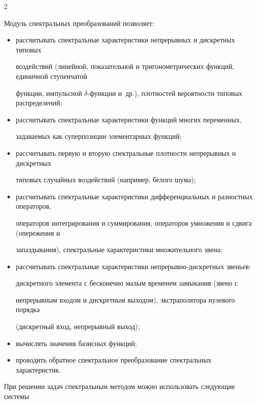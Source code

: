 \begin{multicols}{2}
{Модуль спектральных преобразований позволяет:


\begin{itemize}


  \item рассчитывать спект\-раль\-ные характеристики непрерывных и дискретных типовых 


  воздействий (линейной, показательной и тригонометрических функций, единичной ступенчатой 


  функции, импульсной $\delta$-функ\-ции и~др.), плотностей вероятности типовых распределений;


  \item рассчитывать спект\-раль\-ные характеристики функций многих переменных, 


  задаваемых как суперпозиции элементарных функций;


  \item рассчитывать первую и вторую спект\-раль\-ные плотности непрерывных и дискретных 


  типовых случайных воздействий (например, белого шума);


  \item рассчитывать спект\-раль\-ные характеристики дифференциальных и разностных операторов, 


  операторов интегрирования и суммирования, операторов умножения и сдвига (опережения и 


  запаздывания), спектральные характеристики множительного звена;


  \item рассчитывать спект\-раль\-ные характеристики не\-пре\-рыв\-но-дис\-крет\-ных звеньев: 


  дискретного элемента с бесконечно малым временем замыкания (звено с 


  непрерывным входом и дискретным выходом), экстраполятора нулевого порядка 


  (дискретный вход, непрерывный выход);


  \item вычислять значения базисных функций;


  \item проводить обратное спектральное преобразование спектральных характеристик.


\end{itemize}





При решении задач спектральным методом можно использовать следующие сис\-те\-мы 


}
\end{multicols}

